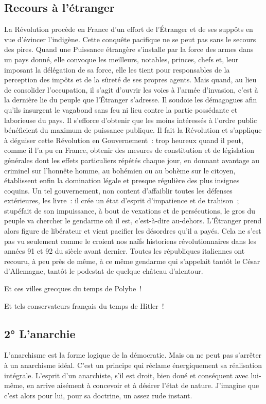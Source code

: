 \documentclass[french,twoside]{book} %
\newcommand{\astermono}{\medskip\centerline{\color{rubric}\large\selectfont{\syms ✻}}\medskip\par}%
\begin{document}
\subsection[{Recours à l’étranger}]{Recours à l’étranger}
\noindent La Révolution procède en France d’un effort de l’Étranger et de ses suppôts en vue d’évincer l’indigène. Cette conquête pacifique ne se peut pas sans le secours des pires. Quand une Puissance étrangère s’installe par la force des armes dans un pays donné, elle convoque les meilleurs, notables, princes, chefs et, leur imposant la délégation de sa force, elle les tient pour responsables de la perception des impôts et de la sûreté de ses propres agents. Mais quand, au lieu de consolider l’occupation, il s’agit d’ouvrir les voies à l’armée d’invasion, c’est à la dernière lie du peuple que l’Étranger s’adresse. Il soudoie les démagogues afin qu’ils insurgent le vagabond sans feu ni lieu contre la partie possédante et laborieuse du pays. Il s’efforce d’obtenir que les moins intéressés à l’ordre public bénéficient du maximum de puissance publique. Il fait la Révolution et s’applique à déguiser cette Révolution en Gouvernement : trop heureux quand il peut, comme il l’a pu en France, obtenir des mesures de constitution et de législation générales dont les effets particuliers répétés chaque jour, en donnant avantage au criminel sur l’honnête homme, au bohémien ou au bohème sur le citoyen, établissent enfin la domination légale et presque régulière des plus insignes coquins. Un tel gouvernement, non content d’affaiblir toutes les défenses extérieures, les livre : il crée un état d’esprit d’impatience et de trahison ; stupéfait de son impuissance, à bout de vexations et de persécutions, le gros du peuple va chercher le gendarme où il est, c’est-à-dire au-dehors. L’Étranger prend alors figure de libérateur et vient pacifier les désordres qu’il a payés. Cela ne s’est pas vu seulement comme le croient nos naïfs historiens révolutionnaires dans les années 91 et 92 du siècle avant dernier. Toutes les républiques italiennes ont recouru, à peu près de même, à ce même gendarme qui s’appelait tantôt le César d’Allemagne, tantôt le podestat de quelque château d’alentour.\par
Et ces villes grecques du temps de Polybe !\par
Et tels conservateurs français du temps de Hitler !\par

\astermono

\subsection[{2° L’anarchie}]{2° L’anarchie}
\noindent L’anarchisme est la forme logique de la démocratie. Mais on ne peut pas s’arrêter à un anarchisme idéal. C’est un principe qui réclame énergiquement sa réalisation intégrale. L’esprit d’un anarchiste, s’il est droit, bien doué et conséquent avec lui-même, en arrive aisément à concevoir et à désirer l’état de nature. J’imagine que c’est alors pour lui, pour sa doctrine, un assez rude instant.\par
\end{document}
